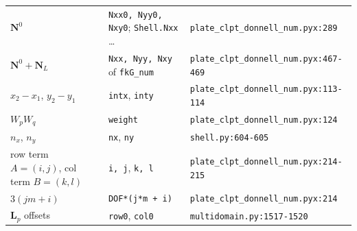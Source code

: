\begin{table}[!htbp]
\begin{tabular}{lll}
		$\boldsymbol{N}^0$ & \texttt{Nxx0, Nyy0, Nxy0}; \texttt{Shell.Nxx} \ldots & \texttt{plate\_clpt\_donnell\_num.pyx:289} \\
		$\boldsymbol{N}^0 + \boldsymbol{N}_L$ & \texttt{Nxx, Nyy, Nxy} of \texttt{fkG\_num} & \texttt{plate\_clpt\_donnell\_num.pyx:467-469} \\
		$x_2-x_1$, $y_2-y_1$ & \texttt{intx}, \texttt{inty} & \texttt{plate\_clpt\_donnell\_num.pyx:113-114} \\
		$W_p W_q$ & \texttt{weight} & \texttt{plate\_clpt\_donnell\_num.pyx:124} \\
		$n_x$, $n_y$ & \texttt{nx}, \texttt{ny} & \texttt{shell.py:604-605} \\
		row term $A = (i,j)$, col term $B = (k,l)$ & \texttt{i, j}, \texttt{k, l} & \texttt{plate\_clpt\_donnell\_num.pyx:214-215} \\
		$3(jm+i)$ & \texttt{DOF*(j*m + i)} & \texttt{plate\_clpt\_donnell\_num.pyx:214} \\
		$\boldsymbol{L}_p$ offsets & \texttt{row0}, \texttt{col0} & \texttt{multidomain.py:1517-1520} \\
		\bottomrule
	\end{tabular}
\end{table}

